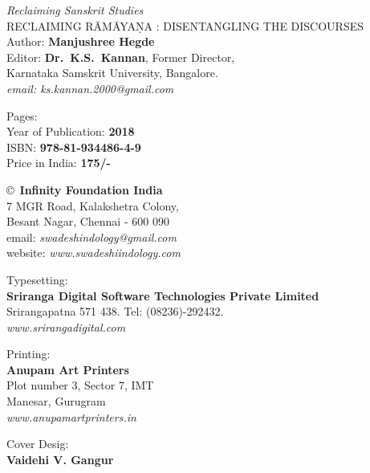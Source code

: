 \thispagestyle{empty}
\noindent
{\fontsize{9}{11}\selectfont\sl Reclaiming Sanskrit Studies}\\
RECLAIMING RĀMĀYAṆA : DISENTANGLING THE DISCOURSES\\ 
Author: {\bf Manjushree Hegde}\\
Editor: {\bf Dr.\ K.S.\ Kannan}, Former Director,\\ 
Karnataka Samskrit University, Bangalore.\\
{\sl email: ks.kannan.2000@gmail.com}
\vfill

\noindent
Pages: {\bf \pageref{book:end}}\\
Year of Publication: {\bf 2018}\\
ISBN: {\bf 978-81-934486-4-9}\\
Price in India: {\bf 175/-}
\vfill

\noindent
\copyright\ {\bf Infinity Foundation India}\\ 
7 MGR Road, Kalakshetra Colony,\\ 
Besant Nagar, Chennai - 600 090\\
email: {\sl swadeshindology@gmail.com}\\
website: {\sl www.swadeshiindology.com} 
\vfill

\noindent
Typesetting:\\
{\bf Sriranga Digital Software Technologies Private Limited}\\ 
Srirangapatna 571 438. Tel: (08236)-292432.\\
{\sl www.srirangadigital.com}\\

\vfill

\noindent
Printing:\\
{\bf Anupam Art Printers}\\
Plot number 3, Sector 7, IMT\\
Manesar, Gurugram\\
{\sl www.anupamartprinters.in}

\vfill
\noindent
Cover Desig:\\
{\bf Vaidehi V. Gangur}
